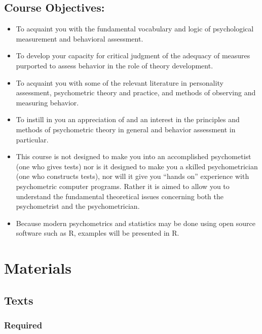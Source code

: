 \documentclass[11pt,]{article}
\providecommand{\tightlist}{%
  \setlength{\itemsep}{0pt}\setlength{\parskip}{0pt}}
\begin{document}
\hypertarget{course-objectives}{%
\subsection{Course Objectives:}\label{course-objectives}}

\begin{itemize}
\tightlist
\item
  To acquaint you with the fundamental vocabulary and logic of
  psychological measurement and behavioral assessment.
\item
  To develop your capacity for critical judgment of the adequacy of
  measures purported to assess behavior in the role of theory
  development.
\item
  To acquaint you with some of the relevant literature in personality
  assessment, psychometric theory and practice, and methods of observing
  and measuring behavior.
\item
  To instill in you an appreciation of and an interest in the principles
  and methods of psychometric theory in general and behavior assessment
  in particular.
\item
  This course is not designed to make you into an accomplished
  psychometist (one who gives tests) nor is it designed to make you a
  skilled psychometrician (one who constructs tests), nor will it give
  you ``hands on'' experience with psychometric computer programs.
  Rather it is aimed to allow you to understand the fundamental
  theoretical issues concerning both the psychometrist and the
  psychometrician.
\item
  Because modern psychometrics and statistics may be done using open
  source software such as R, examples will be presented in R.
\end{itemize}

\hypertarget{materials}{%
\section{Materials}\label{materials}}

\hypertarget{texts}{%
\subsection{Texts}\label{texts}}

\hypertarget{required}{%
\subsubsection{Required}\label{required}}
\end{document}
